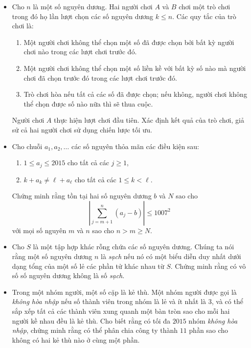 \documentclass[11pt]{scrartcl}
\begin{document}
\begin{itemize}[label=, leftmargin=0em, itemsep=-0em]
    \item \begin{btvn}
        Cho $n$ là một số nguyên dương. Hai người chơi $A$ và $B$ chơi một trò chơi trong đó họ lần lượt chọn các số nguyên dương $k \leq n$. Các quy tắc của trò chơi là:
        \begin{enumerate}
            \item Một người chơi không thể chọn một số đã được chọn bởi bất kỳ người chơi nào trong các lượt chơi trước đó.
            \item Một người chơi không thể chọn một số liền kề với bất kỳ số nào mà người chơi đã chọn trước đó trong các lượt chơi trước đó.
            \item Trò chơi hòa nếu tất cả các số đã được chọn; nếu không, người chơi không thể chọn được số nào nữa thì sẽ thua cuộc.
        \end{enumerate}
        Người chơi $A$ thực hiện lượt chơi đầu tiên. Xác định kết quả của trò chơi, giả sử cả hai người chơi sử dụng chiến lược tối ưu.
    \end{btvn}

    \item \begin{btvn}
    Cho chuỗi $a_1, a_2, \dots$ các số nguyên thỏa mãn các điều kiện sau:
    \begin{enumerate}
        \item $1\le a_j\le2015$ cho tất cả các $j\ge1$,
        \item $k+a_k\neq \ell+a_\ell$ cho tất cả các $1\le k<\ell$.
    \end{enumerate}
    Chứng minh rằng tồn tại hai số nguyên dương $b$ và $N$ sao cho
    \[\left\vert\sum_{j=m+1}^n(a_j-b)\right\vert\le1007^2\]
    với mọi số nguyên $m$ và $n$ sao cho $n>m\ge N$.
    \end{btvn}

    \item \begin{btvn}
        Cho $S$ là một tập hợp khác rỗng chứa các số nguyên dương. Chúng ta nói rằng một số nguyên dương $n$ là \textit{sạch} nếu nó có một biểu diễn duy nhất dưới dạng tổng của một số lẻ các phần tử khác nhau từ $S$. Chứng minh rằng có vô số số nguyên dương không là số \textit{sạch}.
    \end{btvn}
    
    \item \begin{btvn}
        Trong một nhóm người, một số cặp là kẻ thù. Một nhóm người được gọi là \textit{không hòa nhập} nếu số thành viên trong nhóm là lẻ và ít nhất là $3$, và có thể sắp xếp tất cả các thành viên xung quanh một bàn tròn sao cho mỗi hai người kề nhau đều là kẻ thù. Cho biết rằng có tối đa $2015$ nhóm \textit{không hòa nhập}, chứng minh rằng có thể phân chia công ty thành $11$ phần sao cho không có hai kẻ thù nào ở cùng một phần.
    \end{btvn}


\end{itemize}
\end{document}
